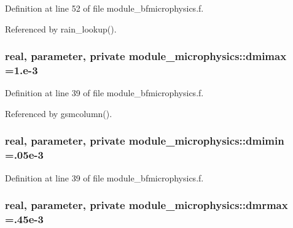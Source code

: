 Definition at line 52 of file module\+\_\+bfmicrophysics.\+f.



Referenced by rain\+\_\+lookup().

\subsubsection[{\texorpdfstring{dmimax}{dmimax}}]{\setlength{\rightskip}{0pt plus 5cm}real, parameter, private module\+\_\+microphysics\+::dmimax =1.e-\/3\hspace{0.3cm}{\ttfamily [private]}}\hypertarget{namespacemodule__microphysics_ab71ad8ff5f6f170585e96194373be5cc}{}\label{namespacemodule__microphysics_ab71ad8ff5f6f170585e96194373be5cc}


Definition at line 39 of file module\+\_\+bfmicrophysics.\+f.



Referenced by gsmcolumn().

\subsubsection[{\texorpdfstring{dmimin}{dmimin}}]{\setlength{\rightskip}{0pt plus 5cm}real, parameter, private module\+\_\+microphysics\+::dmimin =.\+05e-\/3\hspace{0.3cm}{\ttfamily [private]}}\hypertarget{namespacemodule__microphysics_a10a6db795f339c47c5afd6916d0c196b}{}\label{namespacemodule__microphysics_a10a6db795f339c47c5afd6916d0c196b}


Definition at line 39 of file module\+\_\+bfmicrophysics.\+f.

\subsubsection[{\texorpdfstring{dmrmax}{dmrmax}}]{\setlength{\rightskip}{0pt plus 5cm}real, parameter, private module\+\_\+microphysics\+::dmrmax =.\+45e-\/3\hspace{0.3cm}{\ttfamily [private]}}\hypertarget{namespacemodule__microphysics_a5faae0c4f54f72f04b2874f5588276f5}{}\label{namespacemodule__microphysics_a5faae0c4f54f72f04b2874f5588276f5}


